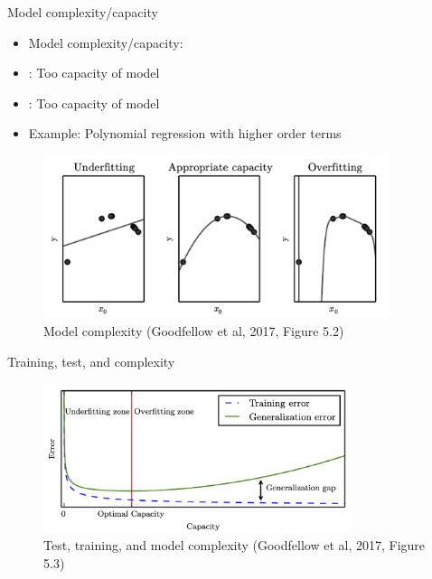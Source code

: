 \documentclass[10pt]{beamer}
\begin{document}
\begin{frame}{Model complexity/capacity}

\begin{itemize}
\item Model complexity/capacity: 
\item {}: Too  capacity of model
\item {}: Too  capacity of model
\item Example: Polynomial regression with higher order terms
\end{itemize}

\begin{figure}[h]
\caption{Model complexity (Goodfellow et al, 2017, Figure 5.2)}
\centering
\includegraphics[width=0.9\textwidth]{figs/Dl_5_2}
\end{figure}

\end{frame}


\begin{frame}{Training, test, and complexity}


\begin{figure}[h]
\caption{Test, training, and model complexity (Goodfellow et al, 2017, Figure 5.3)}
\centering
\includegraphics[width=0.8\textwidth]{figs/Dl_5_3.png}
\end{figure}

\end{frame}
\end{document}

